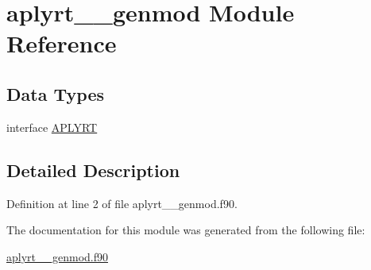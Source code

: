\hypertarget{classaplyrt____genmod}{\section{aplyrt\+\_\+\+\_\+genmod Module Reference}
\label{classaplyrt____genmod}
}
\subsection*{Data Types}
\begin{DoxyCompactItemize}
\item 
interface \hyperlink{interfaceaplyrt____genmod_1_1APLYRT}{A\+P\+L\+Y\+R\+T}
\end{DoxyCompactItemize}


\subsection{Detailed Description}


Definition at line 2 of file aplyrt\+\_\+\+\_\+genmod.\+f90.



The documentation for this module was generated from the following file\+:\begin{DoxyCompactItemize}
\item 
\hyperlink{aplyrt____genmod_8f90}{aplyrt\+\_\+\+\_\+genmod.\+f90}\end{DoxyCompactItemize}
